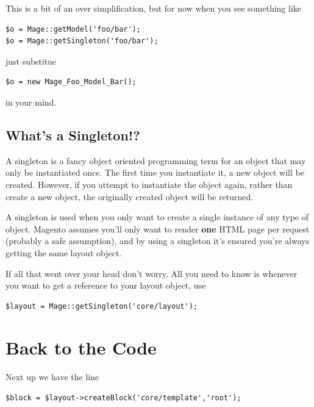 \documentclass[oneside]{book}
\begin{document}
This is a bit of an over simplification, but for now when you see something like

\begin{lstlisting}
$o = Mage::getModel('foo/bar');
$o = Mage::getSingleton('foo/bar');

\end{lstlisting}


just substitue

\begin{lstlisting}
$o = new Mage_Foo_Model_Bar();

\end{lstlisting}


in your mind.

\subsection{What's a Singleton!?}

A singleton is a fancy object oriented programming term for an object that may only be instantiated once.  The first time you instantiate it, a new object will be created.  However, if you attempt to instantiate the object again, rather than create a new object, the originally created object will be returned.  

A singleton is used when you only want to create a single instance of any type of object.  Magento assumes you'll only want to render \textbf{one} HTML page per request (probably a safe assumption), and by using a singleton it's ensured you're always getting the same layout object.

If all that went over your head don't worry.  All you need to know is whenever you want to get a reference to your layout object, use

\begin{lstlisting}
$layout = Mage::getSingleton('core/layout');    

\end{lstlisting}


\section{Back to the Code}

Next up we have the line

\begin{lstlisting}
$block = $layout->createBlock('core/template','root');

\end{lstlisting}
\end{document}
